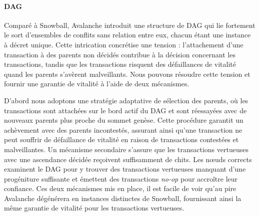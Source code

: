 \documentclass[a4,twocolumn,10pt]{article}
\theoremstyle{definition}
\begin{document}
\paragraph{DAG} Comparé à Snowball, Avalanche introduit une structure de DAG qui lie fortement le sort d'ensembles de conflits sans relation entre eux, chacun étant une instance à décret unique.
Cette intrication concrétise une tension : l'attachement d'une transaction à des parents non décidés contribue à la décision concernant les transactions, tandis que les transactions risquent des défaillances de vitalité quand les parents s'avèrent malveillants.
Nous pouvons résoudre cette tension et fournir une garantie de vitalité à l'aide de deux mécanismes.

D'abord nous adoptons une stratégie adaptative de sélection des parents, où les transactions sont attachées sur le bord actif du DAG et sont réessayées avec de nouveaux parents plus proche du sommet genèse. Cette procédure garantit un achèvement avec des parents incontestés, assurant ainsi qu'une transaction ne peut souffrir de défaillance de vitalité en raison de transactions contestées et malveillantes.
Un mécanisme secondaire s'assure que les transactions vertueuses avec une ascendance décidée reçoivent suffisamment de chits. Les nœuds corrects examinent le DAG pour y trouver des transactions vertueuses manquant d'une progéniture suffisante et émettent des transactions \emph{no-op} pour accroître leur confiance.
Ces deux mécanismes mis en place, il est facile de voir qu'au pire Avalanche dégénérera en instances distinctes de Snowball, fournissant ainsi la même garantie de vitalité pour les transactions vertueuses.
\end{document}
